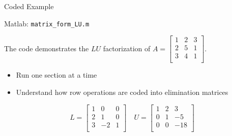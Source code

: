 \documentclass[10pt]{beamer}
\begin{document}
\begin{frame}{Coded Example}

\begin{block}{Matlab: \texttt{matrix\_form\_LU.m}}
    
The code demonstrates the $LU$ factorization of $A  =
\begin{bmatrix}
1 & 2 & 3\\
2 & 5 & 1\\
3 & 4 & 1\\
\end{bmatrix}$.
\end{block}

\begin{itemize}
    \item Run one section at a time
    \item Understand how row operations are coded into elimination matrices
\end{itemize}


$$ 
L =
\begin{bmatrix}
1 & 0 & 0\\
2 & 1 & 0\\
3 & -2 & 1\\
\end{bmatrix} \quad 
U = 
\begin{bmatrix}
1 & 2 & 3\\
0 & 1 & -5\\
0 & 0 & -18\\
\end{bmatrix}
$$
\end{frame}

\end{document}
